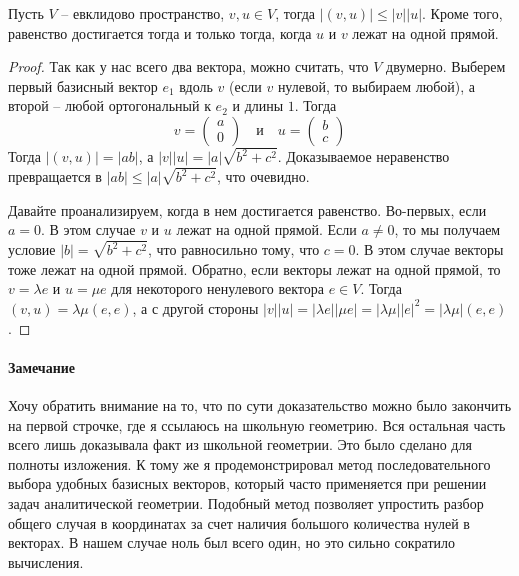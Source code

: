 \begin{claim}
Пусть $V$ -- евклидово пространство, $v,u\in V$, тогда $|(v,u)|\leqslant |v| |u|$.
Кроме того, равенство достигается тогда и только тогда, когда $u$ и $v$ лежат на одной прямой.
\end{claim}
\begin{proof}
Так как у нас всего два вектора, можно считать, что $V$ двумерно.
Выберем первый базисный вектор $e_1$ вдоль $v$ (если $v$ нулевой, то выбираем любой), а второй -- любой ортогональный к $e_2$ и длины $1$.
Тогда
\[
v = 
\begin{pmatrix}
{a}\\{0}
\end{pmatrix}
\quad\text{и}\quad
u = 
\begin{pmatrix}
{b}\\{c}
\end{pmatrix}
\]
Тогда $|(v, u)| = |ab|$, а $|v||u| = |a|\sqrt{b^2 + c^2}$.
Доказываемое неравенство превращается в $|ab|\leqslant |a|\sqrt{b^2 + c^2}$, что очевидно.

Давайте проанализируем, когда в нем достигается равенство.
Во-первых, если $a = 0$.
В этом случае $v$ и $u$ лежат на одной прямой.
Если $a \neq 0$, то мы получаем условие $|b| = \sqrt{b^2 + c^2}$, что равносильно тому, что $c = 0$.
В этом случае векторы тоже лежат на одной прямой.
Обратно, если векторы лежат на одной прямой, то $v = \lambda e$ и $u = \mu e$ для некоторого ненулевого вектора $e\in V$.
Тогда $(v,u) = \lambda\mu (e,e)$, а с другой стороны $|v||u| = |\lambda e||\mu e| = |\lambda \mu| |e|^2 = |\lambda \mu|(e,e)$.
\end{proof}

\paragraph{Замечание} 

Хочу обратить внимание на то, что по сути доказательство можно было закончить на первой строчке, где я ссылаюсь  на школьную геометрию.
Вся остальная часть всего лишь доказывала факт из школьной геометрии.
Это было сделано для полноты изложения.
К тому же я продемонстрировал метод последовательного выбора удобных базисных векторов, который часто применяется при решении задач аналитической геометрии.
Подобный метод позволяет упростить разбор общего случая в координатах за счет наличия большого количества нулей в векторах.
В нашем случае ноль был всего один, но это сильно сократило вычисления.

